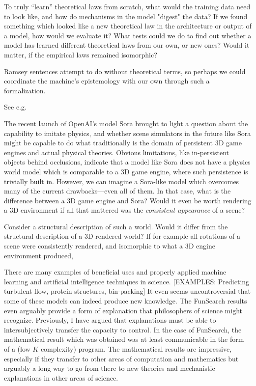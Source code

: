 \documentclass[11pt, oneside]{article}   	%
\begin{document}
To truly ``learn'' theoretical laws from scratch, what would the training data need to look like, and how do mechanisms in the model "digest" the data?  If we found something which looked like a new theoretical law in the architecture or output of a model, how would we evaluate it?  What tests could we do to find out whether a model has learned different theoretical laws from our own, or new ones?  Would it matter, if the empirical laws remained isomorphic?

Ramsey sentences attempt to do without theoretical terms, so perhaps we could coordinate the machine's epistemology with our own through such a formalization.  

See e.g. \citep[\S 26]{Carnap1966} 


The recent launch of OpenAI's model Sora \citep{Sora2024} brought to light a question about the capability to imitate physics, and whether scene simulators in the future like Sora might be capable to do what traditionally is the domain of persistent 3D game engines and actual physical theories.  Obvious limitations, like in-persistent objects behind occlusions, indicate that a model like Sora does not have a physics world model which is comparable to a 3D game engine, where such persistence is trivially built in.  However, we can imagine a Sora-like model which overcomes many of the current drawbacks---even all of them.  In that case, what is the difference between a 3D game engine and Sora?  Would it even be worth rendering a 3D environment if all that mattered was the \emph{consistent appearance} of a scene?

Consider a structural description of such a world. Would it differ from the structural description of a 3D rendered world? If for example all rotations of a scene were consistently rendered, and isomorphic to what a 3D engine environment produced, 




There are many examples of beneficial uses and properly applied machine learning and artificial intelligence techniques in science.  [EXAMPLES: Predicting turbulent flow, protein structures, bin-packing]  It even seems uncontroversial that some of these models can indeed produce new knowledge.  \citep{FunSearch2024}  The FunSearch results even arguably provide a form of explanation that philosophers of science might recognize.  Previously, I have argued that explanations must be able to intersubjectively transfer the capacity to control.  In the case of FunSearch, the mathematical result which was obtained was at least communicable in the form of a (low $K$ complexity) program. The mathematical results are impressive, especially if they transfer to other areas of computation and mathematics but arguably a long way to go from there to new theories and mechanistic explanations in other areas of science.  
\end{document}
